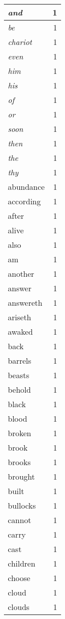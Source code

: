 \begin{center}
\begin{longtable}{l|r}
\emph{and} & 1 \\ \hline
\emph{be} & 1 \\ \hline
\emph{chariot} & 1 \\ \hline
\emph{even} & 1 \\ \hline
\emph{him} & 1 \\ \hline
\emph{his} & 1 \\ \hline
\emph{of} & 1 \\ \hline
\emph{or} & 1 \\ \hline
\emph{soon} & 1 \\ \hline
\emph{then} & 1 \\ \hline
\emph{the} & 1 \\ \hline
\emph{thy} & 1 \\ \hline
abundance & 1 \\ \hline
according & 1 \\ \hline
after & 1 \\ \hline
alive & 1 \\ \hline
also & 1 \\ \hline
am & 1 \\ \hline
another & 1 \\ \hline
answer & 1 \\ \hline
answereth & 1 \\ \hline
ariseth & 1 \\ \hline
awaked & 1 \\ \hline
back & 1 \\ \hline
barrels & 1 \\ \hline
beasts & 1 \\ \hline
behold & 1 \\ \hline
black & 1 \\ \hline
blood & 1 \\ \hline
broken & 1 \\ \hline
brook & 1 \\ \hline
brooks & 1 \\ \hline
brought & 1 \\ \hline
built & 1 \\ \hline
bullocks & 1 \\ \hline
cannot & 1 \\ \hline
carry & 1 \\ \hline
cast & 1 \\ \hline
children & 1 \\ \hline
choose & 1 \\ \hline
cloud & 1 \\ \hline
clouds & 1 \\ \hline

\end{longtable}
\end{center}
